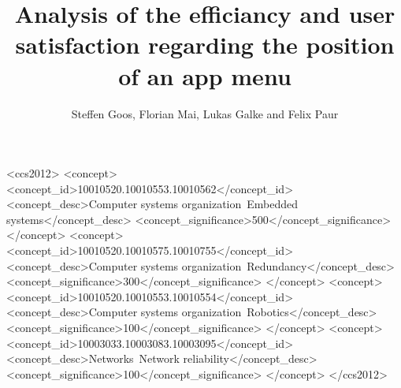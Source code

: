 \documentclass{acmtog} %
\begin{document}

\title{Analysis  of the efficiancy and user satisfaction regarding the position of an app menu} %

\author{Steffen Goos, Florian Mai, Lukas Galke {\upshape and} Felix Paur  
}




%
%
\begin{CCSXML}
<ccs2012>
 <concept>
  <concept_id>10010520.10010553.10010562</concept_id>
  <concept_desc>Computer systems organization~Embedded systems</concept_desc>
  <concept_significance>500</concept_significance>
 </concept>
 <concept>
  <concept_id>10010520.10010575.10010755</concept_id>
  <concept_desc>Computer systems organization~Redundancy</concept_desc>
  <concept_significance>300</concept_significance>
 </concept>
 <concept>
  <concept_id>10010520.10010553.10010554</concept_id>
  <concept_desc>Computer systems organization~Robotics</concept_desc>
  <concept_significance>100</concept_significance>
 </concept>
 <concept>
  <concept_id>10003033.10003083.10003095</concept_id>
  <concept_desc>Networks~Network reliability</concept_desc>
  <concept_significance>100</concept_significance>
 </concept>
</ccs2012>  
\end{CCSXML}


%
%


\end{document}
